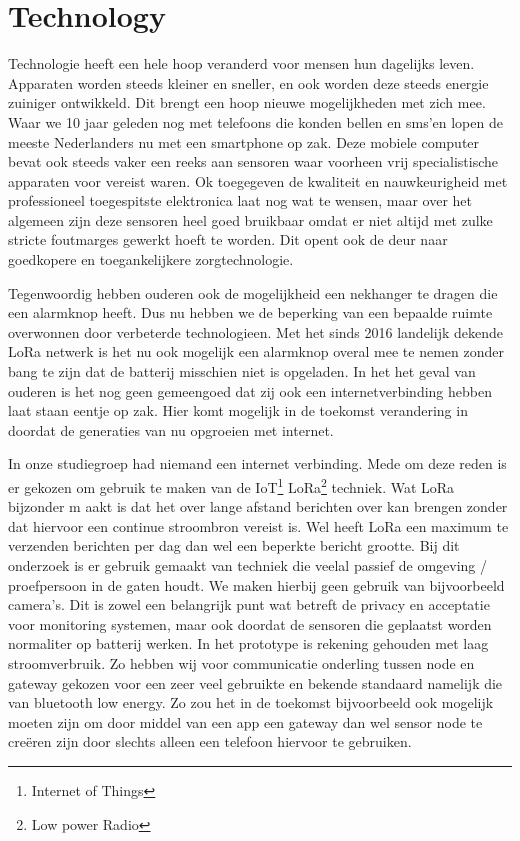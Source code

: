 \documentclass{below-ext}
\begin{document}
\section{Technology}
Technologie heeft een hele hoop veranderd voor mensen hun dagelijks leven. Apparaten worden steeds kleiner en sneller, en ook worden deze steeds energie zuiniger ontwikkeld. Dit brengt een hoop nieuwe mogelijkheden met zich mee. Waar we 10 jaar geleden nog met telefoons die konden bellen en sms'en lopen de meeste Nederlanders nu met een smartphone op zak. Deze mobiele computer bevat ook steeds vaker een reeks aan sensoren waar voorheen vrij specialistische apparaten voor vereist waren. Ok toegegeven de kwaliteit en nauwkeurigheid met professioneel toegespitste elektronica laat nog wat te wensen, maar over het algemeen zijn deze sensoren heel goed bruikbaar omdat er niet altijd met zulke stricte foutmarges gewerkt hoeft te worden. Dit opent ook de deur naar goedkopere en toegankelijkere zorgtechnologie. 


Tegenwoordig hebben ouderen ook de mogelijkheid een nekhanger te dragen die een alarmknop heeft. 
Dus nu hebben we de beperking van een bepaalde ruimte overwonnen door verbeterde technologieen. Met het sinds 2016 landelijk dekende LoRa netwerk is het nu ook mogelijk een alarmknop overal mee te nemen zonder bang te zijn dat de batterij misschien niet is opgeladen. In het het geval van ouderen is het nog geen gemeengoed dat zij ook een internetverbinding hebben laat staan eentje op zak. Hier komt mogelijk in de toekomst verandering in doordat de generaties van nu opgroeien met internet.
 
In onze studiegroep had niemand een internet verbinding. Mede om deze reden is er gekozen om gebruik te maken van de IoT\footnote{Internet of Things} LoRa\footnote{Low power Radio} techniek. Wat LoRa bijzonder m
aakt is dat het over lange afstand berichten over kan brengen zonder dat hiervoor een continue stroombron vereist is. Wel heeft LoRa een maximum te verzenden berichten per dag dan wel een beperkte bericht grootte. Bij dit onderzoek is er gebruik gemaakt van techniek die veelal passief de omgeving / proefpersoon in de gaten houdt. We maken hierbij geen gebruik van bijvoorbeeld camera's. Dit is zowel een belangrijk punt wat betreft de privacy en acceptatie voor monitoring systemen, maar ook doordat de sensoren die geplaatst worden normaliter op batterij werken. In het prototype is rekening gehouden met laag stroomverbruik. Zo hebben wij voor communicatie onderling tussen node en gateway gekozen voor een zeer veel gebruikte en bekende standaard namelijk die van bluetooth low energy. Zo zou het in de toekomst bijvoorbeeld ook mogelijk moeten zijn om door middel van een app een gateway dan wel sensor node te creëren zijn door slechts alleen een telefoon hiervoor te gebruiken. 
\end{document}
